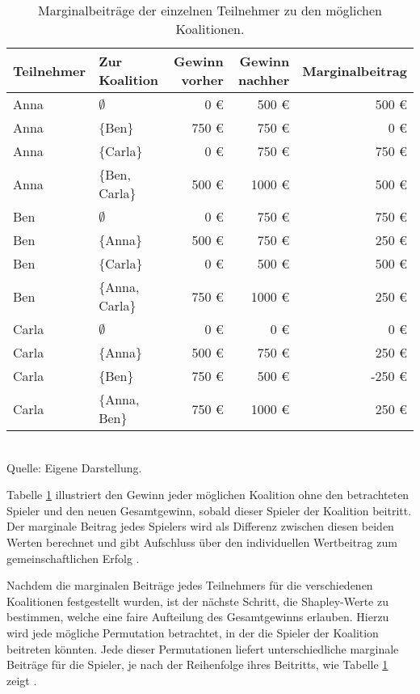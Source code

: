 \begin{table}[!h]
  \caption{Marginalbeiträge der einzelnen Teilnehmer zu den möglichen Koalitionen.}
  \footnotesize
  \begin{tabularx}{\textwidth}{XXrrr}
  \toprule
  Teilnehmer & Zur Koalition & Gewinn vorher & Gewinn nachher & Marginalbeitrag \\
  \midrule
  Anna & $\emptyset$ & 0 \euro & 500 \euro & 500 \euro \\
  Anna & $\{$Ben$\}$ & 750 \euro & 750 \euro & 0 \euro \\
  Anna & $\{$Carla$\}$ & 0 \euro & 750 \euro & 750 \euro \\
  Anna & $\{$Ben, Carla$\}$ & 500 \euro & 1000 \euro & 500 \euro\\
  Ben & $\emptyset$ & 0 \euro & 750 \euro & 750 \euro \\
  Ben & $\{$Anna$\}$ & 500 \euro & 750 \euro & 250 \euro\\
  Ben & $\{$Carla$\}$ & 0 \euro & 500 \euro & 500 \euro\\
  Ben & $\{$Anna, Carla$\}$ & 750 \euro &  1000 \euro & 250 \euro\\
  Carla & $\emptyset$ & 0 \euro & 0 \euro & 0 \euro \\
  Carla & $\{$Anna$\}$ & 500 \euro & 750 \euro & 250 \euro \\
  Carla & $\{$Ben$\}$ & 750 \euro & 500 \euro & -250 \euro \\
  Carla & $\{$Anna, Ben$\}$ & 750 \euro & 1000 \euro & 250 \euro \\
  \bottomrule
  \end{tabularx}
  \label{tab:shapley_marginal}
  \normalsize\\
  Quelle: Eigene Darstellung.
\end{table}

Tabelle \ref{tab:shapley_marginal} illustriert den Gewinn jeder möglichen Koalition ohne den 
betrachteten Spieler und den neuen Gesamtgewinn, sobald dieser Spieler der Koalition beitritt. 
Der marginale Beitrag jedes Spielers wird als Differenz zwischen diesen beiden Werten 
berechnet und gibt Aufschluss über den individuellen Wertbeitrag zum gemeinschaftlichen Erfolg \cite[S. 18]{Molnar_2023}.

Nachdem die marginalen Beiträge jedes Teilnehmers für die verschiedenen Koalitionen festgestellt wurden, 
ist der nächste Schritt, die Shapley-Werte zu bestimmen, welche eine faire Aufteilung des Gesamtgewinns 
erlauben. Hierzu wird jede mögliche Permutation betrachtet, in der die Spieler der 
Koalition beitreten könnten. Jede dieser Permutationen liefert unterschiedliche marginale Beiträge 
für die Spieler, je nach der Reihenfolge ihres Beitritts, wie Tabelle \ref{tab:shapley_marginal} zeigt \cite[S. 19]{Molnar_2023}.

